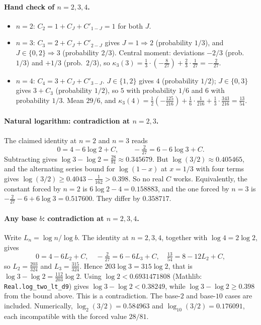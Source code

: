 \documentclass[11pt]{article}
\theoremstyle{definition}
\theoremstyle{plain}
\begin{document}
\paragraph{Hand check of $n=2,3,4$.}
\begin{itemize}
\item $n=2$: $C_2=1+C_J+C'_{1-J}=1$ for both $J$.
\item $n=3$: $C_3=2+C_J+C'_{2-J}$ gives $J=1\Rightarrow 2$ (probability $1/3$), and $J\in\{0,2\}\Rightarrow 3$
(probability $2/3$). Central moment: deviations $-2/3$ (prob.\ $1/3$) and $+1/3$ (prob.\ $2/3$), so
$\kappa_3(3)=\tfrac13\cdot(-\tfrac{8}{27})+\tfrac23\cdot\tfrac1{27}=-\tfrac{2}{27}$.
\item $n=4$: $C_4=3+C_J+C'_{3-J}$. $J\in\{1,2\}$ gives $4$ (probability $1/2$); $J\in\{0,3\}$ gives $3+C_3$ (probability $1/2$),
so $5$ with probability $1/6$ and $6$ with probability $1/3$. Mean $29/6$, and
$\kappa_3(4)=\tfrac12(-\tfrac{125}{216})+\tfrac16\cdot\tfrac1{216}+\tfrac13\cdot\tfrac{343}{216}=\tfrac{13}{54}$.
\end{itemize}

\paragraph{Natural logarithm: contradiction at $n=2,3$.} The claimed identity at $n=2$ and $n=3$ reads
\[
  0 = 4-6\log 2+C,\qquad -\tfrac{2}{27} = 6-6\log 3+C .
\]
Subtracting gives $\log 3-\log 2=\tfrac{28}{81}\approx 0.345679$. But $\log(3/2)\approx 0.405465$, and the alternating
series bound for $\log(1-x)$ at $x=1/3$ with four terms gives $\log(3/2)\ge 0.4043-\tfrac1{162}>0.398$. So no real $C$ works.
Equivalently, the constant forced by $n=2$ is $6\log 2-4=0.158883$, and the one forced by $n=3$ is
$-\tfrac{2}{27}-6+6\log 3=0.517600$. They differ by $0.358717$.

\paragraph{Any base $b$: contradiction at $n=2,3,4$.} Write $L_n=\log n/\log b$. The identity at $n=2,3,4$, together with
$\log 4=2\log 2$, gives
\[
  0=4-6L_2+C,\quad -\tfrac{2}{27}=6-6L_3+C,\quad \tfrac{13}{54}=8-12L_2+C,
\]
so $L_2=\tfrac{203}{324}$ and $L_3=\tfrac{315}{324}$. Hence $203\log 3=315\log 2$, that is
$\log 3-\log 2=\tfrac{112}{203}\log 2$. Using $\log 2<0.6931471808$ (Mathlib: \texttt{Real.log\_two\_lt\_d9}) gives
$\log 3-\log 2<0.38249$, while $\log 3-\log 2\ge 0.398$ from the bound above. This is a contradiction. The base-$2$ and
base-$10$ cases are included. Numerically, $\log_2(3/2)=0.584963$ and $\log_{10}(3/2)=0.176091$, each incompatible with the
forced value $28/81$.
\end{document}
